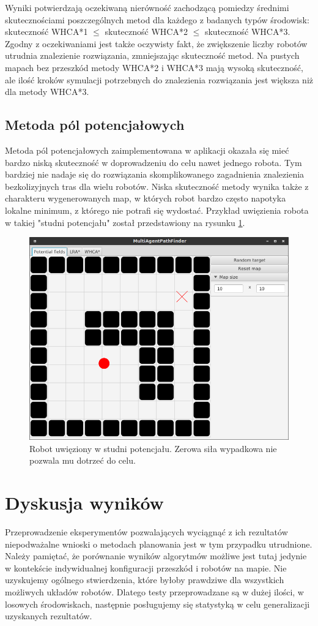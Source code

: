 Wyniki potwierdzają oczekiwaną nierówność zachodzącą pomiedzy średnimi skutecznościami poszczególnych metod dla każdego z badanych typów środowisk:
skuteczność WHCA*1 $\le$ skuteczność WHCA*2 $\le$ skuteczność WHCA*3.
Zgodny z oczekiwaniami jest także oczywisty fakt, że zwiększenie liczby robotów utrudnia znalezienie rozwiązania, zmniejszając skuteczność metod.
Na pustych mapach bez przeszkód metody WHCA*2 i WHCA*3 mają wysoką skuteczność, ale ilość kroków symulacji potrzebnych do znalezienia rozwiązania jest większa niż dla metody WHCA*3.

\subsection{Metoda pól potencjałowych}
Metoda pól potencjałowych zaimplementowana w aplikacji okazała się mieć bardzo niską skuteczność w doprowadzeniu do celu nawet jednego robota.
Tym bardziej nie nadaje się do rozwiązania skomplikowanego zagadnienia znalezienia bezkolizyjnych tras dla wielu robotów.
Niska skuteczność metody wynika także z charakteru wygenerowanych map, w których robot bardzo często napotyka lokalne minimum, z którego nie potrafi się wydostać.
Przykład uwięzienia robota w takiej "studni potencjału" został przedstawiony na rysunku \ref{fig:test-field-potential-hole}.

\begin{figure}
	\centering
	\includegraphics[width=0.8\columnwidth]{img/robopath/field-potential-hole}
	\caption{Robot uwięziony w studni potencjału. Zerowa siła wypadkowa nie pozwala mu dotrzeć do celu.}
	\label{fig:test-field-potential-hole}
\end{figure}

\section{Dyskusja wyników}
Przeprowadzenie eksperymentów pozwalających wyciągnąć z ich rezultatów niepodważalne wnioski o metodach planowania jest w tym przypadku utrudnione.
Należy pamiętać, że porównanie wyników algorytmów możliwe jest tutaj jedynie w kontekście indywidualnej konfiguracji przeszkód i robotów na mapie.
Nie uzyskujemy ogólnego stwierdzenia, które byłoby prawdziwe dla wszystkich możliwych układów robotów.
Dlatego testy przeprowadzane są w dużej ilości, w losowych środowiskach, następnie posługujemy się statystyką w celu generalizacji uzyskanych rezultatów.


